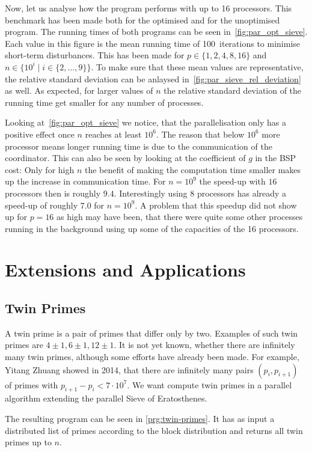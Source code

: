 \documentclass[a4paper,12pt]{article}
\begin{document}
Now, let us analyse how the program performs with up to 16 processors.
This benchmark has been made both for the optimised and for the unoptimised program.
The running times of both programs can be seen in~\autoref{fig:par_opt_sieve}.
Each value in this figure is the mean running time of 100~iterations to minimise short-term disturbances.
This has been made for $p\in\{1,2,4,8,16\}$ and $n\in\{10^i\mid i\in\{2,\dots,9\} \}$.
To make sure that these mean values are representative, the relative standard deviation can be anlaysed in~\autoref{fig:par_sieve_rel_deviation} as well.
As expected, for larger values of $n$ the relative standard deviation of the running time get smaller for any number of processes.

Looking at~\autoref{fig:par_opt_sieve} we notice, that the parallelisation only has a positive effect once $n$ reaches at least $10^6$.
The reason that below $10^6$ more processor means longer running time is due to the communication of the coordinator.
This can also be seen by looking at the coefficient of $g$ in the BSP cost:
Only for high $n$ the benefit of making the computation time smaller makes up the increase in communication time.
For $n=10^9$ the speed-up with $16$ processors then is roughly $9.4$.
Interestingly using $8$ processors has already a speed-up of roughly $7.0$ for $n=10^9$.
A problem that this speedup did not show up for $p=16$ as high may have been, that there were quite some other processes running in the background using up some of the capacities of the 16 processors.


\section{Extensions and Applications}

\subsection{Twin Primes}

A twin prime is a pair of primes that differ only by two.
Examples of such twin primes are $4\pm1, 6\pm1, 12\pm1$.
It is not yet known, whether there are infinitely many twin primes, although some efforts have already been made.
For example, Yitang Zhuang showed in 2014, that there are infinitely many pairs $(p_i, p_{i+1})$ of primes with $p_{i+1} - p_i < 7\cdot 10^7$.
We want compute twin primes in a parallel algorithm extending the parallel Sieve of Eratosthenes.

The resulting program can be seen in \autoref{prg:twin-primes}. It has as input a distributed list of primes according to the block distribution and returns all twin primes up to $n$.
\end{document}
